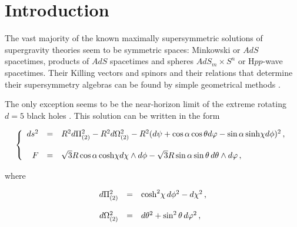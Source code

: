 \documentclass[12pt,a4paper]{article}
\begin{document}
\newpage

\pagestyle{plain}



\section*{Introduction}

The vast majority of the known maximally supersymmetric solutions of
supergravity theories seem to be symmetric spaces: Minkowski or $AdS$
spacetimes, products of $AdS$ spacetimes and spheres $AdS_{m}\times
S^{n}$ or H$pp$-wave spacetimes. Their Killing vectors and spinors and
their relations that determine their supersymmetry algebras can be
found by simple geometrical methods \cite{Alonso-Alberca:2002gh}.

The only exception seems to be the near-horizon limit of the extreme rotating
$d=5$ black holes
\cite{Cvetic:1998xh,Gauntlett:1998fz,Gibbons:1999uv,Herdeiro:2000ap}.  This
solution can be written in the form \cite{Lozano-Tellechea:2002pn}

\begin{equation}
\label{eq:solution}
\left\{
  \begin{array}{rcl}
ds^{2} & = & R^{2}d\Pi_{(2)}^{2} -R^{2}d\Omega_{(2)}^{2}
-R^{2}(d\psi +\cos{\alpha} \cos{\theta} d\varphi -\sin{\alpha}\, {\rm sinh} 
\chi d\phi)^{2}\, ,\\
& & \\
F & = & \sqrt{3}R\cos{\alpha}\, {\rm cosh} \chi d\chi\wedge d\phi
-\sqrt{3}R\sin{\alpha}\sin{\theta}\, d\theta\wedge d\varphi\, ,\\
  \end{array}
\right.  
\end{equation}

\noindent
where 

\begin{equation}
  \begin{array}{rcl}
d\Pi_{(2)}^{2} & = & {\rm cosh}^{2}\chi\, d\phi^{2} -d\chi^{2}  \, ,\\
& & \\
d\Omega_{(2)}^{2} & = & d\theta^{2}+\sin^{2}{\theta}\,d\varphi^{2}\, ,\\
  \end{array}
\end{equation}
\end{document}
